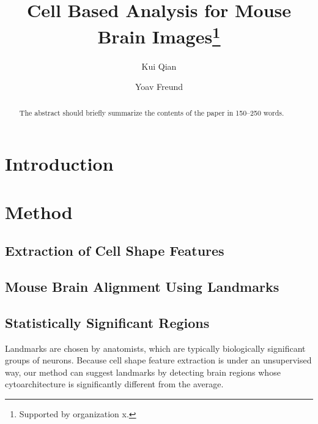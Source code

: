 \documentclass[runningheads]{llncs}
\begin{document}
%
\title{Cell Based Analysis for Mouse Brain Images\thanks{Supported by organization x.}}
%
%
\author{Kui Qian \and
Yoav Freund }
%
%
%
\maketitle              %
%
\begin{abstract}
The abstract should briefly summarize the contents of the paper in
150--250 words.

\end{abstract}
%
%
%
\section{Introduction}


\section{Method}
\subsection{Extraction of Cell Shape Features}


\subsection{Mouse Brain Alignment Using Landmarks}


\subsection{Statistically Significant Regions}

Landmarks are chosen by anatomists, which are typically biologically significant groups of neurons. Because cell shape feature extraction is under an unsupervised way, our method can suggest landmarks by detecting brain regions whose cytoarchitecture is significantly different from the average.
\end{document}
